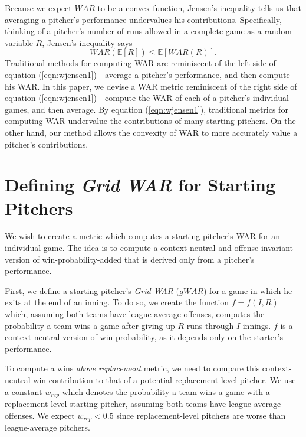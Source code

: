 \documentclass[12pt]{article}
\newcommand{\E}{{\mathbb E}}
\begin{document}
Because we expect $WAR$ to be a convex function, Jensen's inequality tells us that averaging a pitcher's performance undervalues his contributions. Specifically, thinking of a pitcher's number of runs allowed in a complete game as a random variable $R$, Jensen's inequality says
\begin{equation}
WAR(\E[R]) \leq \E[WAR(R)].
\label{eqn:wjensen1}
\end{equation}
Traditional methods for computing WAR are reminiscent of the left side of equation (\ref{eqn:wjensen1}) - average a pitcher's performance, and then compute his WAR. In this paper, we devise a WAR metric reminiscent of the right side of equation (\ref{eqn:wjensen1}) - compute the WAR of each of a pitcher's individual games, and then average. By equation (\ref{eqn:wjensen1}), traditional metrics for computing WAR undervalue the contributions of many starting pitchers. On the other hand, our method allows the convexity of WAR to more accurately value a pitcher's contributions.

\section{Defining \textit{Grid WAR} for Starting Pitchers}

We wish to create a metric which computes a starting pitcher's WAR for an individual game. The idea is to compute a context-neutral and offense-invariant version of win-probability-added that is derived only from a pitcher's performance. 

First, we define a starting pitcher's \textit{Grid WAR} ($gWAR$) for a game in which he exits at the end of an inning. To do so, we create the function $f=f(I,R)$ which, assuming both teams have league-average offenses, computes the probability a team wins a game after giving up $R$ runs through $I$ innings. $f$ is a context-neutral version of win probability, as it depends only on the starter's performance. 

To compute a wins \textit{above replacement} metric, we need to compare this context-neutral win-contribution to that of a potential replacement-level pitcher. We use a constant $w_{rep}$ which denotes the probability a team wins a game with a replacement-level starting pitcher, assuming both teams have league-average offenses. We expect $w_{rep} < 0.5$ since replacement-level pitchers are worse than league-average pitchers. 
\end{document}
